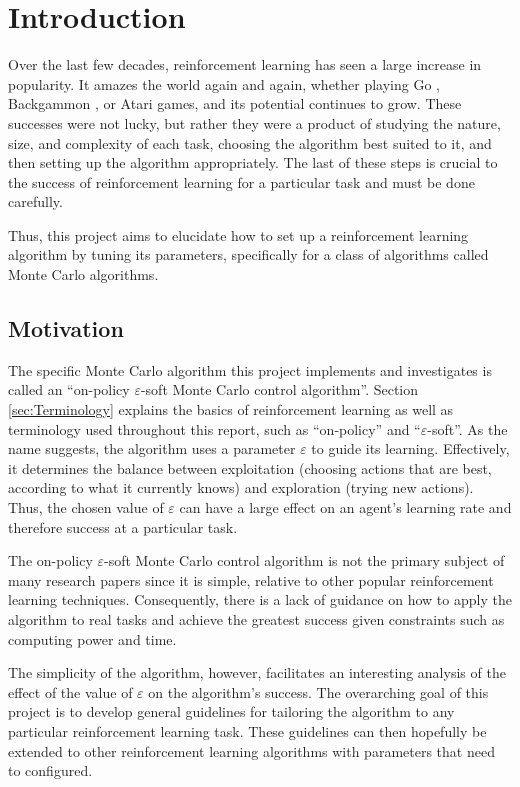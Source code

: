 \documentclass[11pt,a4paper]{report}
\begin{document}
\chapter{Introduction}

Over the last few decades, reinforcement learning has seen a large increase in popularity. It amazes the world again and again, whether playing Go \cite{go}, Backgammon \cite{backgammon}, or Atari \cite{atari} games, and its potential continues to grow. These successes were not lucky, but rather they were a product of studying the nature, size, and complexity of each task, choosing the algorithm best suited to it, and then setting up the algorithm appropriately. The last of these steps is crucial to the success of reinforcement learning for a particular task and must be done carefully.

Thus, this project aims to elucidate how to set up a reinforcement learning algorithm by tuning its parameters, specifically for a class of algorithms called Monte Carlo algorithms.


\section{Motivation}

The specific Monte Carlo algorithm this project implements and investigates is called an ``on-policy $\varepsilon$-soft Monte Carlo control algorithm''. Section \ref{sec:Terminology} explains the basics of reinforcement learning as well as terminology used throughout this report, such as ``on-policy'' and ``$\varepsilon$-soft''. As the name suggests, the algorithm uses a parameter $\varepsilon$ to guide its learning. Effectively, it determines the balance between exploitation (choosing actions that are best, according to what it currently knows) and exploration (trying new actions). Thus, the chosen value of $\varepsilon$ can have a large effect on an agent's learning rate and therefore success at a particular task.

The on-policy $\varepsilon$-soft Monte Carlo control algorithm is not the primary subject of many research papers since it is simple, relative to other popular reinforcement learning techniques. Consequently, there is a lack of guidance on how to apply the algorithm to real tasks and achieve the greatest success given constraints such as computing power and time.

The simplicity of the algorithm, however, facilitates an interesting analysis of the effect of the value of $\varepsilon$ on the algorithm's success. The overarching goal of this project is to develop general guidelines for tailoring the algorithm to any particular reinforcement learning task. These guidelines can then hopefully be extended to other reinforcement learning algorithms with parameters that need to configured.
\end{document}
